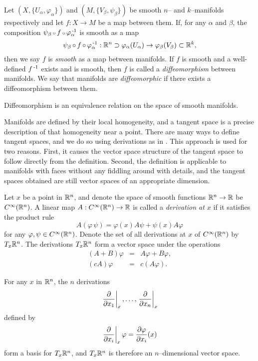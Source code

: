\begin{defn}
	\label{def:smoothmap}
	Let $(X,\{U_\alpha,\varphi_\alpha\})$ and $(M,\{V_\beta,\psi_\beta\})$ be smooth $n$-- and $k$--manifolds respectively and let $f:X\to M$ be a map between them.
	If, for any $\alpha$ and $\beta$, the composition $\psi_\beta\comp f\comp \varphi_\alpha\inv$ is smooth as a map $$\psi_\beta\comp f\comp \varphi_\alpha\inv:\R^n\supset\varphi_\alpha(U_\alpha)\to\varphi_\beta(V_\beta)\subset\R^k,$$ then we say $f$ is \emph{smooth} as a map between manifolds.
	If $f$ is smooth and a well-defined $f^{\,\text{-}1}$ exists and is smooth, then $f$ is called a \emph{diffeomorphism} between manifolds.
	We say that manifolds are \emph{diffeomorphic} if there exists a diffeomorphism between them.
\end{defn}

\begin{prop}
	\label{prop:diffeoequiv}
	Diffeomorphism is an equivalence relation on the space of smooth manifolds.
\end{prop}

Manifolds are defined by their local homogeneity, and a tangent space is a precise description of that homogeneity near a point.
There are many ways to define tangent spaces, and we do so using derivations as in \cite{Lee00}.
This approach is used for two reasons.
First, it causes the vector space structure of the tangent space to follow directly from the definition.
Second, the definition is applicable to manifolds with faces without any fiddling around with details, and the tangent spaces obtained are still vector spaces of an appropriate dimension.

\begin{defn}[Derivations on $\R^n$]
	Let $x$ be a point in $\R^n$, and denote the space of smooth functions $\mathbb{R}^n\to\mathbb{R}$ be $C^\infty(\mathbb{R}^n)$.
	A linear map $A:C^\infty(\mathbb{R}^n)\to\mathbb{R}$ is called a \emph{derivation at $x$} if it satisfies the product rule
	\[
		A(\varphi\,\psi)=\varphi(x)A\psi+\psi(x)A\varphi
	\]
	for any $\varphi,\psi\in C^\infty(\mathbb{R}^n)$.
	Denote the set of all derivations at $x$ of $C^\infty(\mathbb{R}^n)$ by $T_x \mathbb{R}^n$.
	The derivations $T_x \mathbb{R}^n$ form a vector space under the operations
	\[
		\begin{array}{rcl}
			(A+B)\varphi&=&A\varphi+B\varphi,\\
			(cA)\varphi&=&c(A\varphi).
		\end{array}
	\]
\end{defn}

\begin{prop}
	\label{prop:cor33}
	For any $x$ in $\R^n$, the $n$ derivations
	\[
		\left.\frac{\partial}{\partial x_1}\right|_{x}, \dots, \left.\frac{\partial}{\partial x_n}\right|_{x}
	\]
	defined by
	\[
		\left.\frac{\partial}{\partial x_i}\right|_{x}\varphi=\frac{\partial \varphi}{\partial x_i}(x)
	\]
	form a basis for $T_x\mathbb{R}^n$, and $T_x\mathbb{R}^n$ is therefore an $n$--dimensional vector space. 
\end{prop}

